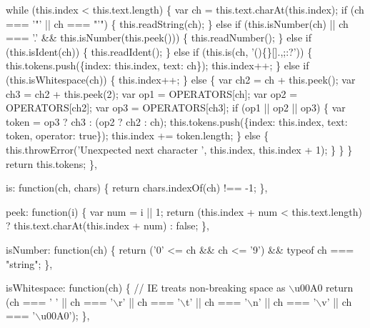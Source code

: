 \begin{DoxyCodeInclude}
{{    \textcolor{keywordflow}{while} (this.index < this.text.length) \{
      var ch = this.text.charAt(this.index);
      \textcolor{keywordflow}{if} (ch === \textcolor{charliteral}{'"'} || ch === \textcolor{stringliteral}{"'"}) \{
        this.readString(ch);
      \} \textcolor{keywordflow}{else} \textcolor{keywordflow}{if} (this.isNumber(ch) || ch === \textcolor{charliteral}{'.'} && this.isNumber(this.peek())) \{
        this.readNumber();
      \} \textcolor{keywordflow}{else} \textcolor{keywordflow}{if} (this.isIdent(ch)) \{
        this.readIdent();
      \} \textcolor{keywordflow}{else} \textcolor{keywordflow}{if} (this.is(ch, \textcolor{stringliteral}{'()\{\}[].,;:?'})) \{
        this.tokens.push(\{index: this.index, text: ch\});
        this.index++;
      \} \textcolor{keywordflow}{else} \textcolor{keywordflow}{if} (this.isWhitespace(ch)) \{
        this.index++;
      \} \textcolor{keywordflow}{else} \{
        var ch2 = ch + this.peek();
        var ch3 = ch2 + this.peek(2);
        var op1 = OPERATORS[ch];
        var op2 = OPERATORS[ch2];
        var op3 = OPERATORS[ch3];
        \textcolor{keywordflow}{if} (op1 || op2 || op3) \{
          var token = op3 ? ch3 : (op2 ? ch2 : ch);
          this.tokens.push(\{index: this.index, text: token, \textcolor{keyword}{operator}: \textcolor{keyword}{true}\});
          this.index += token.length;
        \} \textcolor{keywordflow}{else} \{
          this.throwError(\textcolor{stringliteral}{'Unexpected next character '}, this.index, this.index + 1);
        \}
      \}
    \}
    \textcolor{keywordflow}{return} this.tokens;
  \},

  is: \textcolor{keyword}{function}(ch, chars) \{
    \textcolor{keywordflow}{return} chars.indexOf(ch) !== -1;
  \},

  peek: \textcolor{keyword}{function}(i) \{
    var num = i || 1;
    \textcolor{keywordflow}{return} (this.index + num < this.text.length) ? this.text.charAt(this.index + num) : \textcolor{keyword}{false};
  \},

  isNumber: \textcolor{keyword}{function}(ch) \{
    \textcolor{keywordflow}{return} (\textcolor{charliteral}{'0'} <= ch && ch <= \textcolor{charliteral}{'9'}) && typeof ch === \textcolor{stringliteral}{"string"};
  \},

  isWhitespace: \textcolor{keyword}{function}(ch) \{
    \textcolor{comment}{// IE treats non-breaking space as \(\backslash\)u00A0}
    \textcolor{keywordflow}{return} (ch === \textcolor{charliteral}{' '} || ch === \textcolor{charliteral}{'\(\backslash\)r'} || ch === \textcolor{charliteral}{'\(\backslash\)t'} ||
            ch === \textcolor{charliteral}{'\(\backslash\)n'} || ch === \textcolor{charliteral}{'\(\backslash\)v'} || ch === \textcolor{stringliteral}{'\(\backslash\)u00A0'});
  \},

}}
\end{DoxyCodeInclude}
